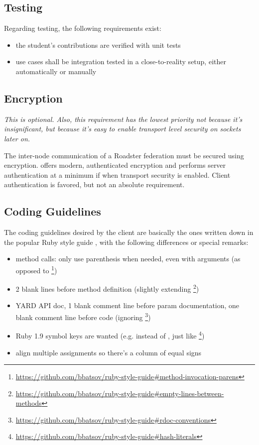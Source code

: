 \subsection{Testing}
Regarding testing, the following requirements exist:
\begin{itemize}
	\item the student's contributions are verified with unit tests
	\item use cases shall be integration tested in a close-to-reality setup, either automatically or manually
\end{itemize}

\subsection{Encryption}
\emph{This is optional. Also, this requirement has the lowest priority not
because it's insignificant, but because it's easy to enable transport level
security on \zmq sockets later on.}

The inter-node communication of a Roadster federation must be secured using
encryption. \zmq offers modern, authenticated encryption and performs server authentication at a minimum if when transport security is
enabled. Client authentication is favored, but not an absolute requirement.

\subsection{Coding Guidelines}
The coding guidelines desired by the client are basically the ones written down
in the popular Ruby style guide \cite{rb:style-guide}, with the following
differences or special remarks:

\begin{itemize}
	\item method calls: only use parenthesis when needed, even with arguments (as opposed to \footnote{\url{https://github.com/bbatsov/ruby-style-guide\#method-invocation-parens}})
	\item 2 blank lines before method definition (slightly extending \footnote{\url{https://github.com/bbatsov/ruby-style-guide\#empty-lines-between-methods}})
	\item YARD API doc, 1 blank comment line before param documentation, one blank comment line before code (ignoring \footnote{\url{https://github.com/bbatsov/ruby-style-guide\#rdoc-conventions}})
	\item Ruby 1.9 symbol keys are wanted (e.g.  instead of , just like \footnote{\url{https://github.com/bbatsov/ruby-style-guide\#hash-literals}})
	\item align multiple assignments so there's a column of equal signs
\end{itemize}
